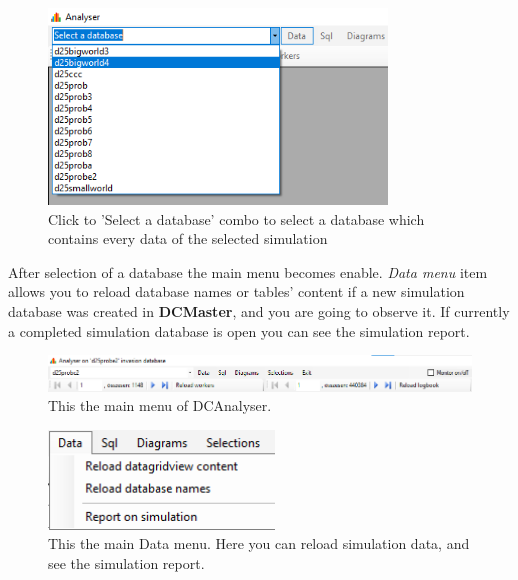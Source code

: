 \documentclass[a4paper,12pt]{article}
\begin{document}
\begin{figure}
	\begin{center}
		\includegraphics[width=9cm]{dcaselect.png}
		\caption{Click to 'Select a database' combo to select a database which contains every data of the selected simulation}
		\label{fig:dcaselect}
	\end{center}
\end{figure}

After selection of a database the main menu becomes enable. \textit{Data menu} item allows you to reload database names or tables' content if a new simulation database was created in \textbf{DCMaster}, and you are going to observe it. If currently a completed simulation database is open you can see the simulation report.


\begin{figure}
	\begin{center}
		\includegraphics[width=14cm]{dcamainmenu}
		\caption{This the main menu of DCAnalyser. }
		\label{fig:dca_main}
	\end{center}
\end{figure}


\begin{figure}
	\begin{center}
		\includegraphics[width=6cm]{mnureloadata}
		\caption{This the main Data menu. Here you can reload simulation data, and see the simulation report. }
		\label{fig:dca_main}
	\end{center}
\end{figure}
\end{document}
